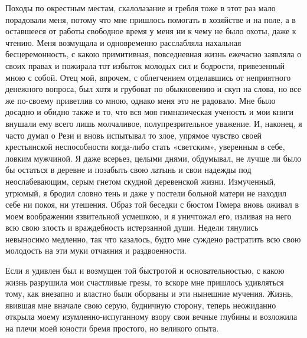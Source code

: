 Походы по окрестным местам, скалолазание и гребля тоже в этот раз мало
порадовали меня,  потому что  мне пришлось помогать  в хозяйстве  и на
поле, а  в оставшееся от  работы свободное время у  меня ни к  чему не
было охоты, даже  к чтению. Меня возмущала  и одновременно расслабляла
нахальная  бесцеремонность, с  какою  примитивная, повседневная  жизнь
ежечасно заявляла о своих правах и  пожирала тот избыток молодых сил и
бодрости, привезенный мною  с собой. Отец мой,  впрочем, с облегчением
отделавшись от неприятного  денежного вопроса, был хотя  и грубоват по
обыкновению и  скуп на слова, но  все же по-своему приветлив  со мною,
однако меня это не радовало. Мне было досадно и обидно также и то, что
вся  моя гимназическая  ученость и  мои книги  внушали ему  всего лишь
молчаливое, полупрезрительное  уважение. И,  наконец, я часто  думал о
Рези и  вновь испытывал  то злое,  упрямое чувство  своей крестьянской
неспособности когда-либо  стать «светским»,  уверенным в  себе, ловким
мужчиной. Я даже всерьез, целыми днями, обдумывал, не лучше ли было бы
остаться  в  деревне  и  позабыть  свою  латынь  и  свои  надежды  под
неослабевающим,  серым гнетом  скудной деревенской  жизни. Измученный,
угрюмый,  я бродил  словно тень  и даже  у постели  больной матери  не
находил себе ни покоя, ни утешения.  Образ той беседки с бюстом Гомера
вновь оживал  в моем воображении  язвительной усмешкою, и  я уничтожал
его,  изливая  на него  всю  свою  злость и  враждебность  истерзанной
души.  Недели тянулись  невыносимо медленно,  так что  казалось, будто
мне  суждено растратить  всю свою  молодость  на эти  муки отчаяния  и
раздвоенности.

Если  я удивлен  был и  возмущен той  быстротой и  основательностью, с
какою жизнь  разрушила мои  счастливые грезы,  то вскоре  мне пришлось
удивляться тому, как  внезапно и властно были оборваны  и эти нынешние
мучения.  Жизнь, явившая  мне вначале  свою серую,  будничную сторону,
теперь  неожиданно  открыла  моему  изумленно-испуганному  взору  свои
вечные глубины  и возложила  на плечи моей  юности бремя  простого, но
великого опыта.

